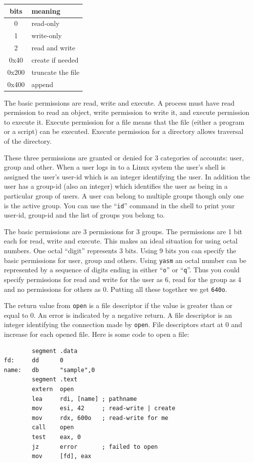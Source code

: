 \documentclass[11pt,b5paper]{book}
\begin{document}
\begin{center}
    \begin{tabular}{|c|l|}
        \hline
        bits & meaning \\
        \hline
        0    & read-only \\
        \hline
        1    & write-only \\
        \hline
        2    & read and write \\
        \hline
        0x40 & create if needed \\
        \hline
        0x200 & truncate the file \\
        \hline
        0x400 & append \\
        \hline
    \end{tabular}
\end{center}

The basic permissions are read, write and execute. 
A process must have read permission to read an object, write permission to write it, and
execute permission to execute it.
Execute permission for a file means that the file (either a program or a script) can be executed.
Execute permission for a directory allows traversal of the directory.

These three permissions are granted or denied for 3 categories of accounts: user, group and other.
When a user logs in to a Linux system the user's shell is assigned the user's user-id which is an
integer identifying the user.
In addition the user has a group-id (also an integer) which identifies the user as being in a particular group of users.
A user can belong to multiple groups though only one is the active group.
You can use the ``{\tt id}'' command in the shell to print your user-id, group-id and the list of groups you
belong to.

The basic permissions are 3 permissions for 3 groups.
The permissions are 1 bit each for read, write and execute.
This makes an ideal situation for using octal numbers.
One octal ``digit'' represents 3 bits.
Using 9 bits you can specify the basic permissions for user, group and others.
Using {\tt yasm} an octal number can be represented by a sequence of digits ending in either ``{\tt o}'' or
``{\tt q}''.
Thus you could specify permissions for read and write for the user as 6, read for the group as 4 and no
permissions for others as 0.
Putting all these together we get {\tt 640o}.

The return value from {\tt open} is a file descriptor if the value is greater than or equal to 0.
An error is indicated by a negative return.
A file descriptor is an integer identifying the connection made by {\tt open}.
File descriptors start at 0 and increase for each opened file.
Here is some code to open a file:
\begin{verbatim}
        segment .data
fd:     dd      0
name:   db      "sample",0
        segment .text
        extern  open
        lea     rdi, [name] ; pathname
        mov     esi, 42     ; read-write | create
        mov     rdx, 600o   ; read-write for me
        call    open
        test    eax, 0
        jz      error       ; failed to open
        mov     [fd], eax
\end{verbatim}
\end{document}
